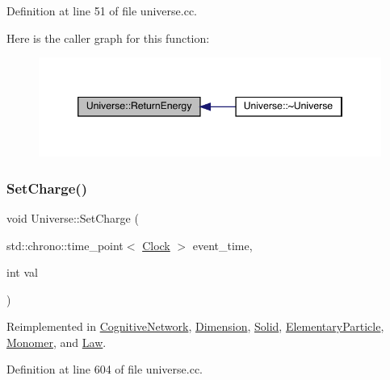 Definition at line 51 of file universe.\+cc.

Here is the caller graph for this function\+:
\nopagebreak
\begin{figure}[H]
\begin{center}
\leavevmode
\includegraphics[width=346pt]{class_universe_aeda74e3902c0e56c0c09779854045cde_icgraph}
\end{center}
\end{figure}
\mbox{\label{class_universe_a3b3da7c86a7b75e5e5c0b7972ac82a87}} 
\subsubsection{\texorpdfstring{Set\+Charge()}{SetCharge()}}
{\footnotesize\ttfamily void Universe\+::\+Set\+Charge (\begin{DoxyParamCaption}\item[{std\+::chrono\+::time\+\_\+point$<$ \hyperlink{universe_8h_a0ef8d951d1ca5ab3cfaf7ab4c7a6fd80}{Clock} $>$}]{event\+\_\+time,  }\item[{int}]{val }\end{DoxyParamCaption})\hspace{0.3cm}{\ttfamily [virtual]}}



Reimplemented in \hyperlink{class_cognitive_network_a99f801aeca299186cc706696696749b1}{Cognitive\+Network}, \hyperlink{class_dimension_a6d3f7fa4a26b92d8ae6161a1b8bb8220}{Dimension}, \hyperlink{class_solid_a37503e6b25f912254414e778af2e75cd}{Solid}, \hyperlink{class_elementary_particle_abbc6d3c58509c4121df55bfef716d2f1}{Elementary\+Particle}, \hyperlink{class_monomer_a1ee35c888318e590082e6cd1772bb430}{Monomer}, and \hyperlink{class_law_a2e780573f6285f88d167d45a2e243d01}{Law}.



Definition at line 604 of file universe.\+cc.

